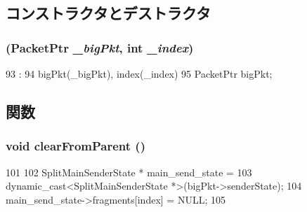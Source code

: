 \subsection{コンストラクタとデストラクタ}
\hypertarget{classTimingSimpleCPU_1_1SplitFragmentSenderState_ae73b8316523497e5139ed6765e33f44a}{
\subsubsection[{SplitFragmentSenderState}]{ ({\bf PacketPtr} {\em \_\-bigPkt}, \/  int {\em \_\-index})}}
\label{classTimingSimpleCPU_1_1SplitFragmentSenderState_ae73b8316523497e5139ed6765e33f44a}



\begin{DoxyCode}
93                                                                 :
94             bigPkt(_bigPkt), index(_index)
95         {}
        PacketPtr bigPkt;
\end{DoxyCode}


\subsection{関数}
\hypertarget{classTimingSimpleCPU_1_1SplitFragmentSenderState_aef30187d34647a597501907f985a6bda}{
\subsubsection[{clearFromParent}]{\setlength{\rightskip}{0pt plus 5cm}void clearFromParent ()}}
\label{classTimingSimpleCPU_1_1SplitFragmentSenderState_aef30187d34647a597501907f985a6bda}



\begin{DoxyCode}
101         {
102             SplitMainSenderState * main_send_state =
103                 dynamic_cast<SplitMainSenderState *>(bigPkt->senderState);
104             main_send_state->fragments[index] = NULL;
105         }
\end{DoxyCode}


